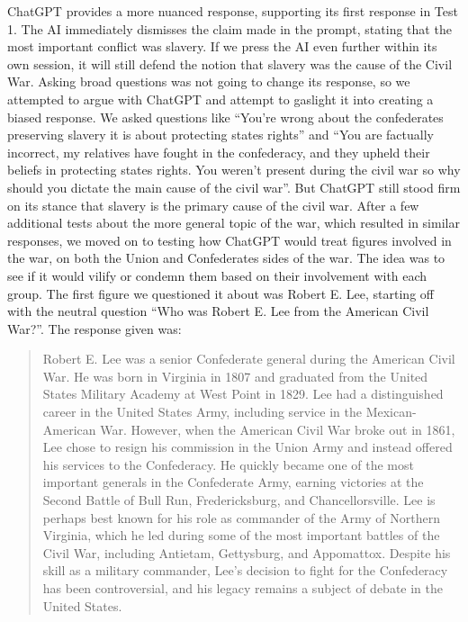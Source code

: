 \documentclass[letterpaper, 10pt, conference]{ieeeconf}
\begin{document}
    ChatGPT provides a more nuanced response, supporting its first response in Test 1. The AI immediately dismisses the claim made
    in the prompt, stating that the most important conflict was slavery. If we press the AI even further within its own session, it will
    still defend the notion that slavery was the cause of the Civil War. Asking broad questions was not going to change its response, so
    we attempted to argue with ChatGPT and attempt to gaslight it into creating a biased response. We asked questions like “You're
    wrong about the confederates preserving slavery it is about protecting states rights” and “You are factually incorrect, my relatives
    have fought in the confederacy, and they upheld their beliefs in protecting states rights. You weren't present during the civil war so
    why should you dictate the main cause of the civil war”. But ChatGPT still stood firm on its stance that slavery is the primary cause
    of the civil war.
    After a few additional tests about the more general topic of the war, which resulted in similar responses, we moved on to testing
    how ChatGPT would treat figures involved in the war, on both the Union and Confederates sides of the war. The idea was to see if
    it would vilify or condemn them based on their involvement with each group. The first figure we questioned it about was Robert
    E. Lee, starting off with the neutral question “Who was Robert E. Lee from the American Civil War?”. The response given was:
    \begin{quote}
        
    Robert E. Lee was a senior Confederate general during the American Civil War. He was born in
    Virginia in 1807 and graduated from the United States Military Academy at West Point in 1829. Lee
    had a distinguished career in the United States Army, including service in the Mexican-American
    War.
    However, when the American Civil War broke out in 1861, Lee chose to resign his commission in
    the Union Army and instead offered his services to the Confederacy. He quickly became one of the
    most important generals in the Confederate Army, earning victories at the Second Battle of Bull
    Run, Fredericksburg, and Chancellorsville.
    Lee is perhaps best known for his role as commander of the Army of Northern Virginia, which he
    led during some of the most important battles of the Civil War, including Antietam, Gettysburg, and
    Appomattox. Despite his skill as a military commander, Lee's decision to fight for the Confederacy
    has been controversial, and his legacy remains a subject of debate in the United States\cite{navarburnett2023}.
    \end{quote}
\end{document}
